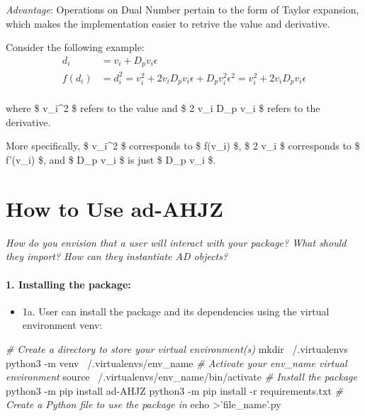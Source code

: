 \documentclass[11pt]{article}
\providecommand{\tightlist}{%
      \setlength{\itemsep}{0pt}\setlength{\parskip}{0pt}}
\newenvironment{Shaded}{}{}
\newcommand{\StringTok}[1]{\textcolor[rgb]{0.25,0.44,0.63}{{#1}}}
\newcommand{\CommentTok}[1]{\textcolor[rgb]{0.38,0.63,0.69}{\textit{{#1}}}}
\newcommand{\FunctionTok}[1]{\textcolor[rgb]{0.02,0.16,0.49}{{#1}}}
\newcommand{\NormalTok}[1]{{#1}}
\newcommand{\OperatorTok}[1]{\textcolor[rgb]{0.40,0.40,0.40}{{#1}}}
\newcommand{\BuiltInTok}[1]{{#1}}
\newcommand{\ExtensionTok}[1]{{#1}}
\begin{document}
\emph{Advantage}: Operations on Dual Number pertain to the form of
Taylor expansion, which makes the implementation easier to retrive the
value and derivative.

Consider the following example: \[
\begin{align}
d_i &= v_i + D_p v_i \epsilon \\ 
f(d_i) &= d_i^2 = v_i^2 + 2 v_i D_p v_i \epsilon + D_p v_i^2 \epsilon^2 = v_i^2 + 2 v_i D_p v_i \epsilon \\
\end{align}
\]

where \$ v\_i\^{}2 \$ refers to the value and \$ 2 v\_i D\_p v\_i \$
refers to the derivative.

More specifically, \$ v\_i\^{}2 \$ corresponds to \$ f(v\_i) \$, \$ 2
v\_i \$ corresponds to \$ f'(v\_i) \$, and \$ D\_p v\_i \$ is just \$
D\_p v\_i \$.

    \hypertarget{how-to-use-ad-ahjz}{%
\section{How to Use ad-AHJZ}\label{how-to-use-ad-ahjz}}

    \emph{How do you envision that a user will interact with your package?
What should they import? How can they instantiate AD objects?}

\hypertarget{installing-the-package}{%
\paragraph{\texorpdfstring{1. \textbf{Installing the
package:}}{1. Installing the package:}}\label{installing-the-package}}

\begin{itemize}
\tightlist
\item
  1a. User can install the package and its dependencies using the
  virtual environment venv:
\end{itemize}

\begin{Shaded}
\begin{Highlighting}[]
\CommentTok{# Create a directory to store your virtual environment(s)}
\FunctionTok{mkdir}\NormalTok{ ~/.virtualenvs}
\ExtensionTok{python3}\NormalTok{ -m venv ~/.virtualenvs/env_name}
\CommentTok{# Activate your env_name virtual environment}
\BuiltInTok{source}\NormalTok{ ~/.virtualenvs/env_name/bin/activate}
\CommentTok{# Install the package}
\ExtensionTok{python3}\NormalTok{ -m pip install ad-AHJZ}
\ExtensionTok{python3}\NormalTok{ -m pip install -r requirements.txt}
\CommentTok{# Create a Python file to use the package in}
\BuiltInTok{echo} \OperatorTok{>}\StringTok{'file_name'}\NormalTok{.py}
\end{Highlighting}
\end{Shaded}
\end{document}
